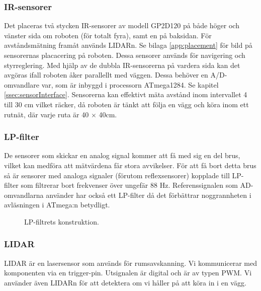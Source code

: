 \documentclass[a4paper,11pt]{article}
\begin{document}
\subsubsection{IR-sensorer} \label{sssec:sonicsensors}
Det placeras två stycken IR-sensorer av modell GP2D120 på både höger och vänster sida om roboten (för totalt fyra), samt en på baksidan. För avståndsmätning framåt används LIDARn. Se bilaga \ref{app:placement} för bild på sensorernas placacering på roboten. Dessa sensorer används för navigering och styrreglering. Med hjälp av de dubbla IR-sensorerna på vardera sida kan det avgöras ifall roboten åker parallellt med väggen. Dessa behöver en A/D-omvandlare var, som är inbyggd i processorn ATmega1284. Se kapitel \ref{ssec:sensorInterface}. Sensorerna kan effektivt mäta avstånd inom intervallet 4 till 30 cm vilket räcker, då roboten är tänkt att följa en vägg och köra inom ett rutnät, där varje ruta är 40 $\times$ 40cm.

\subsubsection{LP-filter}
De sensorer som skickar en analog signal kommer att få med sig en del brus, vilket kan medföra att mätvärdena får stora avvikelser. För att få bort detta brus så är sensorer med analoga signaler (förutom reflexsensorer) kopplade till LP-filter som filtrerar bort frekvenser över ungefär 88 \si{\hertz}. Referenssignalen som AD-omvandlarna använder har också ett LP-filter då det förbättrar noggrannheten i avläsningen i ATmega:n betydligt.

\begin{figure}[h!]
	\caption{LP-filtrets konstruktion.}
	\label{fig:lpFilter}
\end{figure}

\subsubsection{LIDAR} \label{sssec:lidar}
LIDAR är en lasersensor som används för rumsavskanning. Vi kommunicerar med komponenten via en trigger-pin. Utsignalen är digital och är av typen PWM. Vi använder även LIDARn för att detektera om vi håller på att köra in i en vägg.
\end{document}
